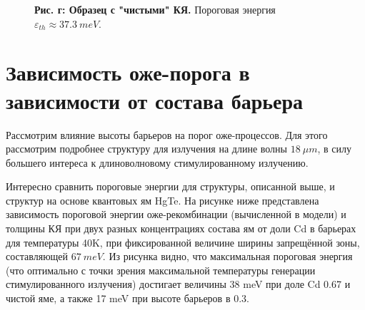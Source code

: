 \documentclass[../main.tex]{subfiles}
\begin{document}
\begin{figure}[h!]
\begin{minipage}[h]{0.49\linewidth}
\begin{center}
                    \textbf{Рис. г: Образец с "чистыми" КЯ.} Пороговая энергия 
                        $\varepsilon_{th} \approx 37.3~meV$.
                \end{center}
            \end{minipage}
        \end{figure}
        

        \section{Зависимость оже-порога в зависимости от состава барьера}

        Рассмотрим влияние высоты барьеров на порог оже-процессов. Для 
        этого рассмотрим подробнее структуру для излучения на длине волны $18~\mu m$,
        в силу большего интереса к длиноволновому стимулированному излучению.

        Интересно сравнить пороговые энергии для структуры, описанной выше, и структур на основе квантовых ям HgTe. На рисунке ниже представлена 
        зависимость пороговой энергии оже-рекомбинации (вычисленной в модели) и толщины КЯ при двух разных концентрациях состава ям
        от доли Cd в барьерах для температуры 40K, 
        при фиксированной величине ширины запрещённой зоны, составляющей $67~meV$. Из рисунка видно, что максимальная пороговая энергия (что оптимально 
        с точки зрения максимальной температуры генерации стимулированного излучения) достигает величины 38 meV при доле Cd 0.67 и чистой яме, а также 
        17 meV при высоте барьеров в 0.3.
\end{document}

